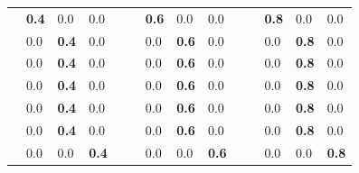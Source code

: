 \documentclass[11pt]{umnthesis}
\begin{document}
\begin{table}
\begin{tabular}{llllllllllllll}
                        & \textbf{0.4}           & 0.0                    & 0.0                    &                      &                         & \textbf{0.6}           & 0.0                    & 0.0                    &                      &                         & \textbf{0.8}           & 0.0                    & 0.0                     \\
                        & 0.0                    & \textbf{0.4}           & 0.0                    &                      &                         & 0.0                    & \textbf{0.6}           & 0.0                    &                      &                         & 0.0                    & \textbf{0.8}           & 0.0                     \\
                        & 0.0                    & \textbf{0.4}           & 0.0                    &                      &                         & 0.0                    & \textbf{0.6}           & 0.0                    &                      &                         & 0.0                    & \textbf{0.8}           & 0.0                     \\
                        & 0.0                    & \textbf{0.4}           & 0.0                    &                      &                         & 0.0                    & \textbf{0.6}           & 0.0                    &                      &                         & 0.0                    & \textbf{0.8}           & 0.0                     \\
                        & 0.0                    & \textbf{0.4}           & 0.0                    &                      &                         & 0.0                    & \textbf{0.6}           & 0.0                    &                      &                         & 0.0                    & \textbf{0.8}           & 0.0                     \\
                        & 0.0                    & \textbf{0.4}           & 0.0                    &                      &                         & 0.0                    & \textbf{0.6}           & 0.0                    &                      &                         & 0.0                    & \textbf{0.8}           & 0.0                     \\
                        & 0.0                    & 0.0                    & \textbf{0.4}           &                      &                         & 0.0                    & 0.0                    & \textbf{0.6}           &                      &                         & 0.0                    & 0.0                    & \textbf{0.8}            \\

\end{tabular}
\end{table}
\end{document}
